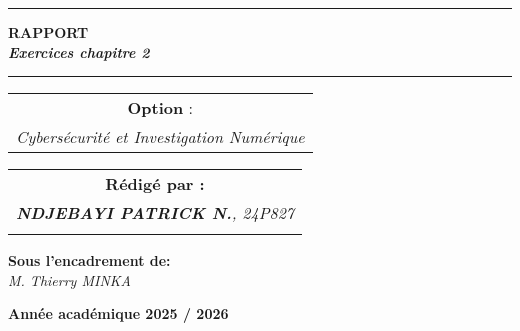 \documentclass[12pt,a4paper]{article}
\begin{document}
\begin{titlepage}
\begin{center}
		\vspace{0.5cm}
		\begin{tabular}{l*{40}{@{\hskip 3.5cm}c@{\hskip5cm}} p{3.5cm} r}
		\end{tabular}
		
		\noindent\rule{\textwidth}{0.7mm}
		\Large{{\textbf{RAPPORT}}}\\
		\Large{{\textbf{\textit{Exercices chapitre 2}}}}
		\noindent\rule{\textwidth}{0.7mm}
	\end{center}
		
	\begin{center}
	\begin{tabular}{c}
		
		\vspace{0.1cm}
		\normalsize
	
	
		\vspace{0.1cm}
		\normalsize\textbf{Option }:\\			
		\textsl{Cybersécurité et Investigation Numérique}
		
	\end{tabular}
	\end{center}
		
	\begin{center}
		\normalsize %
		\begin{tabular}{c}
			\vspace{0.07cm}
			\hspace{0.02cm} \textbf{\textbf{Rédigé par :}}\\
			
			\hspace{0.02cm} \textsl{\textbf{NDJEBAYI PATRICK N.}, 24P827}\\\\
			
			
		\end{tabular}
	\end{center}
	
	\begin{center}
	\hspace{0.02cm} \textbf{Sous l'encadrement de:}\\
	\hspace{0.02cm} \textsl{M. Thierry MINKA}
	\end{center}
	
    
	\vspace{2cm}
	\begin{center}
		\textbf{Année académique 2025 / 2026}
	\end{center}
		
	\vspace{-1.4cm}
	
		
	\vfill%
	
\end{titlepage}
\tableofcontents
\end{document}
